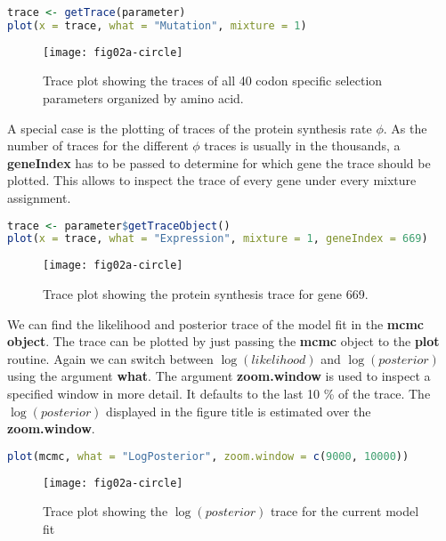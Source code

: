 \begin{lstlisting}[language=R]
trace <- getTrace(parameter)
plot(x = trace, what = "Mutation", mixture = 1)
\end{lstlisting}

\begin{figure}[h]
  \centering
  \texttt{[image: fig02a-circle]}\\
  \caption{Trace plot showing the traces of all 40 codon specific selection parameters organized by amino acid.}
  \label{fig:mutation_trace}
\end{figure} 

A special case is the plotting of traces of the protein synthesis rate $\phi$. 
As the number of traces for the different $\phi$ traces is usually in the thousands, a \textbf{geneIndex} has to be passed to determine for which gene the trace should be plotted. 
This allows to inspect the trace of every gene under every mixture assignment.

\begin{lstlisting}[language=R]
trace <- parameter$getTraceObject()
plot(x = trace, what = "Expression", mixture = 1, geneIndex = 669)
\end{lstlisting}

\begin{figure}[h]
  \centering
  \texttt{[image: fig02a-circle]}\\
  \caption{Trace plot showing the protein synthesis trace for gene 669.}
  \label{fig:logphi_trace}
\end{figure} 

We can find the likelihood and posterior trace of the model fit in the \textbf{mcmc object}. 
The trace can be plotted by just passing the \textbf{mcmc} object to the \textbf{plot} routine. 
Again we can switch between $\log(likelihood)$ and $\log(posterior)$ using the argument \textbf{what}. 
The argument \textbf{zoom.window} is used to inspect a specified window in more detail. 
It defaults to the last 10 \% of the trace. 
The $\log(posterior)$ displayed in the figure title is estimated over the \textbf{zoom.window}.

\begin{lstlisting}[language=R]
plot(mcmc, what = "LogPosterior", zoom.window = c(9000, 10000))
\end{lstlisting}


\begin{figure}[h]
  \centering
  \texttt{[image: fig02a-circle]}\\
  \caption{Trace plot showing the $\log(posterior)$ trace for the current model fit}
  \label{fig:logpost_trace}
\end{figure} 

